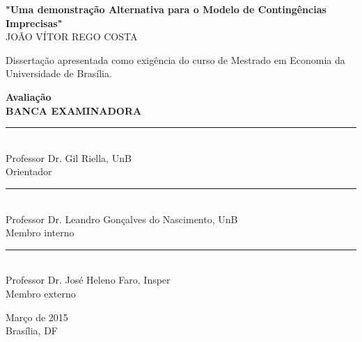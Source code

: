 \documentclass[11pt, a4paper]{article}
\theoremstyle{nonumberplain}
\theoremstyle{plain}
\theoremstyle{plain}
\theoremstyle{plain}
\theoremstyle{nonumberplain}
\begin{document}
\begin{titlepage}
\begin{center}
\textbf{"Uma demonstração Alternativa para o Modelo de Contingências Imprecisas"}\\
\vspace{1.5cm}
\uppercase{joão vítor rego costa}\\
\vspace{1cm}
\begin{flushright}
\begin{minipage}[c]{8cm}
Dissertação apresentada como exigência do curso de Mestrado em Economia da Universidade de Brasília.
\end{minipage}
\end{flushright}
\end{center}
\vspace{1.5cm}
\begin{flushleft}
\textbf{Avaliação}\\
\uppercase{\textbf{banca examinadorA}}\\
\vspace{1.5cm}
\rule{10cm}{.1pt}\\
Professor Dr. Gil Riella, UnB\\
Orientador\\
\vspace{1.5cm} 
\rule{10cm}{.1pt}\\
Professor Dr. Leandro Gonçalves do Nascimento, UnB\\
Membro interno\\
\vspace{1.5cm}
\rule{10cm}{.1pt}\\
Professor Dr. José Heleno Faro, Insper\\
Membro externo\\
\vfill

\begin{center}
Março de 2015\\ Brasília, DF 
\end{center}
\end{flushleft}

\end{titlepage}
\end{document}
